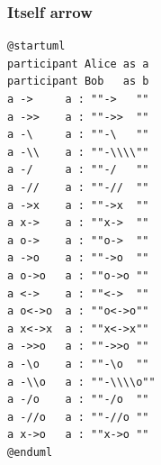 \subsubsection{Itself arrow}
\begin{verbatim}
@startuml
participant Alice as a
participant Bob   as b
a ->     a : ""->   ""
a ->>    a : ""->>  ""
a -\     a : ""-\   ""
a -\\    a : ""-\\\\""
a -/     a : ""-/   ""
a -//    a : ""-//  ""
a ->x    a : ""->x  ""
a x->    a : ""x->  ""
a o->    a : ""o->  ""
a ->o    a : ""->o  ""
a o->o   a : ""o->o ""
a <->    a : ""<->  ""
a o<->o  a : ""o<->o""
a x<->x  a : ""x<->x""
a ->>o   a : ""->>o ""
a -\o    a : ""-\o  ""
a -\\o   a : ""-\\\\o""
a -/o    a : ""-/o  ""
a -//o   a : ""-//o ""
a x->o   a : ""x->o ""
@enduml
\end{verbatim}

